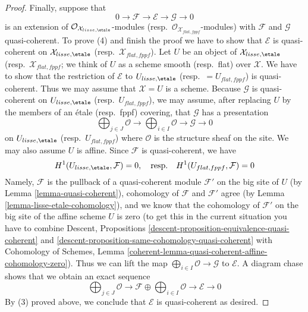 \begin{proof}
\medskip\noindent
Finally, suppose that
$$
0 \to \mathcal{F} \to \mathcal{E} \to \mathcal{G} \to 0
$$
is an extension of $\mathcal{O}_{\mathcal{X}_{lisse,\etale}}$-modules
(resp.\ $\mathcal{O}_{\mathcal{X}_{flat,fppf}}$-modules) with $\mathcal{F}$
and $\mathcal{G}$ quasi-coherent. To prove (4) and finish the proof
we have to show that
$\mathcal{E}$ is quasi-coherent on $\mathcal{X}_{lisse,\etale}$
(resp.\ $\mathcal{X}_{flat,fppf}$). Let $U$
be an object of $\mathcal{X}_{lisse,\etale}$
(resp.\ $\mathcal{X}_{flat,fppf}$; we think of $U$ as a scheme smooth
(resp.\ flat) over $\mathcal{X}$. We have to show that the restriction
of $\mathcal{E}$ to $U_{lisse,\etale}$ (resp.\ $=U_{flat,fppf}$)
is quasi-coherent. Thus we may assume
that $\mathcal{X} = U$ is a scheme. Because $\mathcal{G}$
is quasi-coherent on $U_{lisse,\etale}$ (resp.\ $U_{flat,fppf}$),
we may assume, after replacing $U$ by the members
of an \'etale (resp.\ fppf) covering, that $\mathcal{G}$ has a
presentation
$$
\bigoplus\nolimits_{j \in J} \mathcal{O} \longrightarrow
\bigoplus\nolimits_{i \in I} \mathcal{O} \longrightarrow
\mathcal{G} \longrightarrow 0
$$
on $U_{lisse,\etale}$ (resp.\ $U_{flat,fppf}$) where $\mathcal{O}$
is the structure sheaf on the site. We may also assume $U$ is affine.
Since $\mathcal{F}$ is quasi-coherent, we have
$$
H^1(U_{lisse,\etale}, \mathcal{F}) = 0,
\quad\text{resp.}\quad
H^1(U_{flat,fppf}, \mathcal{F}) = 0
$$
Namely, $\mathcal{F}$ is the pullback of a quasi-coherent module
$\mathcal{F}'$ on the big site of $U$
(by Lemma \ref{lemma-quasi-coherent}), cohomology
of $\mathcal{F}$ and $\mathcal{F}'$ agree (by
Lemma \ref{lemma-lisse-etale-cohomology}), and we know that
the cohomology of $\mathcal{F}'$ on the big site of the affine scheme $U$
is zero (to get this in the current situation you have to
combine Descent, Propositions
\ref{descent-proposition-equivalence-quasi-coherent} and
\ref{descent-proposition-same-cohomology-quasi-coherent} with
Cohomology of Schemes, Lemma
\ref{coherent-lemma-quasi-coherent-affine-cohomology-zero}).
Thus we can lift the map
$\bigoplus_{i \in I} \mathcal{O} \to \mathcal{G}$
to $\mathcal{E}$. A diagram chase shows that we obtain
an exact sequence
$$
\bigoplus\nolimits_{j \in J} \mathcal{O} \to
\mathcal{F} \oplus \bigoplus\nolimits_{i \in I} \mathcal{O}
\to
\mathcal{E} \to 0
$$
By (3) proved above, we conclude that $\mathcal{E}$ is quasi-coherent
as desired.
\end{proof}









